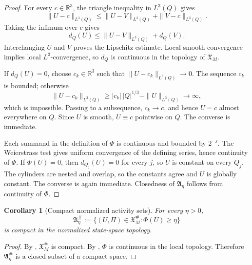 \documentclass[11pt]{amsart}
\numberwithin{equation}{section}
\theoremstyle{plain}
\newtheorem{corollary}[theorem]{Corollary}
\theoremstyle{definition}
\theoremstyle{remark}
\begin{document}
\begin{proof}
For every \(c\in\mathbb R^3\), the triangle inequality in \(L^3(Q)\) gives
\[
   \|U-c\|_{L^3(Q)}
   \le
   \|U-V\|_{L^3(Q)}+\|V-c\|_{L^3(Q)}.
\]
Taking the infimum over \(c\) gives
\[
   d_Q(U)\le \|U-V\|_{L^3(Q)}+d_Q(V).
\]
Interchanging \(U\) and \(V\) proves the Lipschitz estimate.  Local smooth
convergence implies local \(L^3\)-convergence, so \(d_Q\) is continuous in the
topology of \(\mathfrak X_M\).

If \(d_Q(U)=0\), choose \(c_k\in\mathbb R^3\) such that
\(\|U-c_k\|_{L^3(Q)}\to0\).  The sequence \(c_k\) is bounded; otherwise
\[
   \|U-c_k\|_{L^3(Q)}
   \ge |c_k|\,|Q|^{1/3}-\|U\|_{L^3(Q)}
   \to\infty ,
\]
which is impossible.  Passing to a subsequence, \(c_k\to c\), and hence
\(U=c\) almost everywhere on \(Q\).  Since \(U\) is smooth, \(U\equiv c\)
pointwise on \(Q\).  The converse is immediate.

Each summand in the definition of \(\Phi\) is continuous and bounded by
\(2^{-j}\).  The Weierstrass test gives uniform convergence of the defining
series, hence continuity of \(\Phi\).  If \(\Phi(U)=0\), then
\(d_{Q_j}(U)=0\) for every \(j\), so \(U\) is constant on every \(Q_j\).  The
cylinders are nested and overlap, so the constants agree and \(U\) is globally
constant.  The converse is again immediate.  Closedness of
\(\mathfrak A_\eta\) follows from continuity of \(\Phi\).
\end{proof}

\begin{corollary}[Compact normalized activity sets]
\label{cor:compact-normalized-activity-set}
For every \(\eta>0\),
\[
   \mathfrak A_\eta^\#
   :=
   \{(U,\Pi)\in\mathfrak X_M^\#:\Phi(U)\ge\eta\}
\]
is compact in the normalized state-space topology.
\end{corollary}

\begin{proof}
By , \(\mathfrak X_M^\#\) is compact.
By , \(\Phi\) is continuous in the local
topology.  Therefore \(\mathfrak A_\eta^\#\) is a closed subset of a compact
space.
\end{proof}
\end{document}
